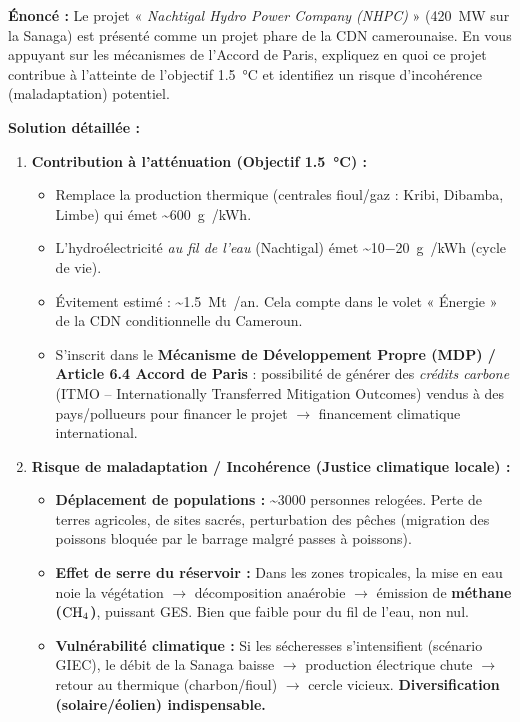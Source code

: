 \documentclass[11pt]{article}
\begin{document}
\begin{exoresolu}
\textbf{Énoncé :} Le projet « \emph{Nachtigal Hydro Power Company (NHPC)} » (\SI{420}{MW} sur la Sanaga) est présenté comme un projet phare de la CDN camerounaise. En vous appuyant sur les mécanismes de l'Accord de Paris, expliquez en quoi ce projet contribue à l'atteinte de l'objectif \SI{1,5}{\celsius} et identifiez un risque d'incohérence (maladaptation) potentiel.

\textbf{Solution détaillée :}
\begin{enumerate}
    \item \textbf{Contribution à l'atténuation (Objectif \SI{1,5}{\celsius}) :}
    \begin{itemize}
        \item Remplace la production thermique (centrales fioul/gaz : Kribi, Dibamba, Limbe) qui émet \textasciitilde \SI{600}{g /kWh}.
        \item L'hydroélectricité \emph{au fil de l'eau} (Nachtigal) émet \textasciitilde \SI{10-20}{g /kWh} (cycle de vie).
        \item Évitement estimé : \textasciitilde \SI{1,5}{Mt /an}. Cela compte dans le volet « Énergie » de la CDN conditionnelle du Cameroun.
        \item S'inscrit dans le \textbf{Mécanisme de Développement Propre (MDP) / Article 6.4 Accord de Paris} : possibilité de générer des \emph{crédits carbone} (ITMO -- Internationally Transferred Mitigation Outcomes) vendus à des pays/pollueurs pour financer le projet $\rightarrow$ financement climatique international.
    \end{itemize}
    \item \textbf{Risque de maladaptation / Incohérence (Justice climatique locale) :}
    \begin{itemize}
        \item \textbf{Déplacement de populations :} \textasciitilde 3000 personnes relogées. Perte de terres agricoles, de sites sacrés, perturbation des pêches (migration des poissons bloquée par le barrage malgré passes à poissons).
        \item \textbf{Effet de serre du réservoir :} Dans les zones tropicales, la mise en eau noie la végétation $\rightarrow$ décomposition anaérobie $\rightarrow$ émission de \textbf{méthane ($\ce{CH4}$)}, puissant GES. Bien que faible pour du fil de l'eau, non nul.
        \item \textbf{Vulnérabilité climatique :} Si les sécheresses s'intensifient (scénario GIEC), le débit de la Sanaga baisse $\rightarrow$ production électrique chute $\rightarrow$ retour au thermique (charbon/fioul) $\rightarrow$ cercle vicieux. \textbf{Diversification (solaire/éolien) indispensable.}

\end{itemize}
\end{enumerate}
\end{exoresolu}
\end{document}
